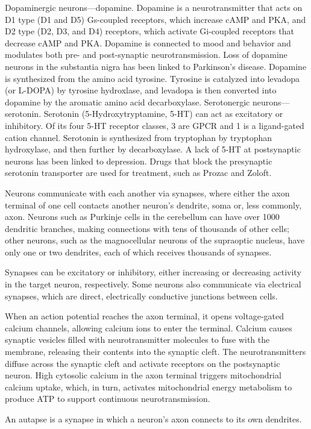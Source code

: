 Dopaminergic neurons---dopamine. Dopamine is a neurotransmitter that acts on D1 type (D1 and D5) Gs-coupled receptors, which increase cAMP and PKA, and D2 type (D2, D3, and D4) receptors, which activate Gi-coupled receptors that decrease cAMP and PKA. Dopamine is connected to mood and behavior and modulates both pre- and post-synaptic neurotransmission. Loss of dopamine neurons in the substantia nigra has been linked to Parkinson's disease. Dopamine is synthesized from the amino acid tyrosine. Tyrosine is catalyzed into levadopa (or L-DOPA) by tyrosine hydroxlase, and levadopa is then converted into dopamine by the aromatic amino acid decarboxylase.
Serotonergic neurons---serotonin. Serotonin (5-Hydroxytryptamine, 5-HT) can act as excitatory or inhibitory. Of its four 5-HT receptor classes, 3 are GPCR and 1 is a ligand-gated cation channel. Serotonin is synthesized from tryptophan by tryptophan hydroxylase, and then further by decarboxylase. A lack of 5-HT at postsynaptic neurons has been linked to depression. Drugs that block the presynaptic serotonin transporter are used for treatment, such as Prozac and Zoloft.

Neurons communicate with each another via synapses, where either the axon terminal of one cell contacts another neuron's dendrite, soma or, less commonly, axon. Neurons such as Purkinje cells in the cerebellum can have over 1000 dendritic branches, making connections with tens of thousands of other cells; other neurons, such as the magnocellular neurons of the supraoptic nucleus, have only one or two dendrites, each of which receives thousands of synapses.

Synapses can be excitatory or inhibitory, either increasing or decreasing activity in the target neuron, respectively. Some neurons also communicate via electrical synapses, which are direct, electrically conductive junctions between cells.

When an action potential reaches the axon terminal, it opens voltage-gated calcium channels, allowing calcium ions to enter the terminal. Calcium causes synaptic vesicles filled with neurotransmitter molecules to fuse with the membrane, releasing their contents into the synaptic cleft. The neurotransmitters diffuse across the synaptic cleft and activate receptors on the postsynaptic neuron. High cytosolic calcium in the axon terminal triggers mitochondrial calcium uptake, which, in turn, activates mitochondrial energy metabolism to produce ATP to support continuous neurotransmission.

An autapse is a synapse in which a neuron's axon connects to its own dendrites.


